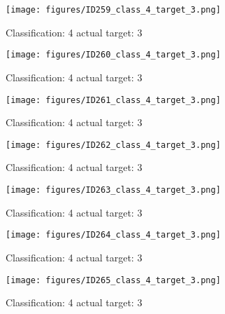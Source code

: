 \begin{figure}[h!]
\begin{center}
\texttt{[image: figures/ID259\_class\_4\_target\_3.png]}
\end{center}
\caption{ Classification: 4 actual target: 3}
\label{fig:ID259_class_4_target_3}
\end{figure}
\begin{figure}[h!]
\begin{center}
\texttt{[image: figures/ID260\_class\_4\_target\_3.png]}
\end{center}
\caption{ Classification: 4 actual target: 3}
\label{fig:ID260_class_4_target_3}
\end{figure}
\begin{figure}[h!]
\begin{center}
\texttt{[image: figures/ID261\_class\_4\_target\_3.png]}
\end{center}
\caption{ Classification: 4 actual target: 3}
\label{fig:ID261_class_4_target_3}
\end{figure}
\begin{figure}[h!]
\begin{center}
\texttt{[image: figures/ID262\_class\_4\_target\_3.png]}
\end{center}
\caption{ Classification: 4 actual target: 3}
\label{fig:ID262_class_4_target_3}
\end{figure}
\begin{figure}[h!]
\begin{center}
\texttt{[image: figures/ID263\_class\_4\_target\_3.png]}
\end{center}
\caption{ Classification: 4 actual target: 3}
\label{fig:ID263_class_4_target_3}
\end{figure}
\begin{figure}[h!]
\begin{center}
\texttt{[image: figures/ID264\_class\_4\_target\_3.png]}
\end{center}
\caption{ Classification: 4 actual target: 3}
\label{fig:ID264_class_4_target_3}
\end{figure}
\begin{figure}[h!]
\begin{center}
\texttt{[image: figures/ID265\_class\_4\_target\_3.png]}
\end{center}
\caption{ Classification: 4 actual target: 3}
\label{fig:ID265_class_4_target_3}
\end{figure}
